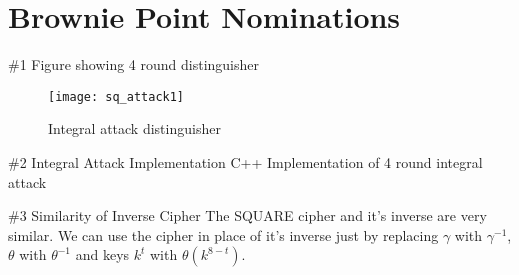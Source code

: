 \section{Brownie Point Nominations}

\begin{frame}{\#1 Figure showing 4 round distinguisher}
  \begin{figure}
    \centering
    \texttt{[image: sq\_attack1]}
    \caption{Integral attack distinguisher}
  \end{figure}
\end{frame}

\begin{frame}{\#2 Integral Attack Implementation}
  C++ Implementation of 4 round integral attack
\end{frame}

\begin{frame}{\#3 Similarity of Inverse Cipher}
  The SQUARE cipher and it's inverse are very similar. We can use the cipher in place of it's inverse just by replacing $\gamma$ with $\gamma^{-1}$, $\theta$ with $\theta^{-1}$ and keys $k^t$ with $\theta(k^{8-t})$.
\end{frame}